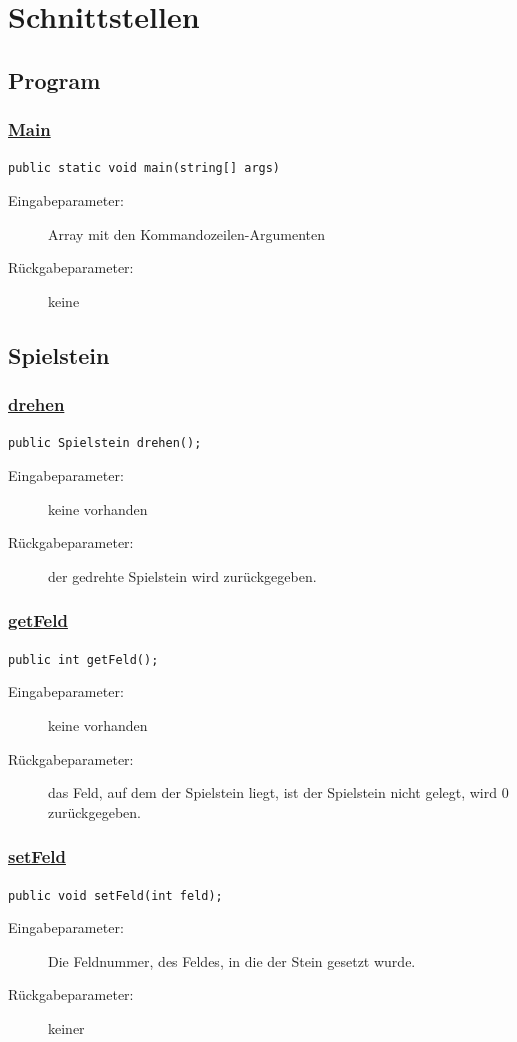\section{Schnittstellen}
\subsection{Program}
\subsubsection{\underline{Main}}
\lstinline{public static void main(string[] args)}
\begin{description}
	\item [Eingabeparameter:] Array mit den Kommandozeilen-Argumenten
	\item [Rückgabeparameter:] keine
\end{description}

\subsection{Spielstein}
\subsubsection{\underline{drehen}}
\lstinline{public Spielstein drehen();}
\begin{description}
	\item [Eingabeparameter:] keine vorhanden
	\item [Rückgabeparameter:] der gedrehte Spielstein wird zurückgegeben.
\end{description}

\subsubsection{\underline{getFeld}}
\lstinline{public int getFeld();}
\begin{description}
	\item [Eingabeparameter:] keine vorhanden
	\item [Rückgabeparameter:] das Feld, auf dem der Spielstein liegt, ist der Spielstein nicht gelegt, wird 0 zurückgegeben.
\end{description}

\subsubsection{\underline{setFeld}}
\lstinline{public void setFeld(int feld);}
\begin{description}
	\item [Eingabeparameter:] Die Feldnummer, des Feldes, in die der Stein gesetzt wurde.
	\item [Rückgabeparameter:] keiner
\end{description}

